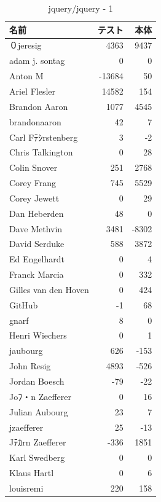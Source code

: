 \begin{table}[htb]
\begin{center}
\caption{jquery/jquery - 1}
\begin{tabular}{|l|r|r|} \hline 
名前 & テスト & 本体 \\ \hline \hline
０jeresig & 4363 & 9437\\ \hline
adam j. sontag & 0 & 0\\ \hline
Anton M & -13684 & 50\\ \hline
Ariel Flesler & 14582 & 154\\ \hline
Brandon Aaron & 1077 & 4545\\ \hline
brandonaaron & 42 & 7\\ \hline
Carl Fﾃｼrstenberg & 3 & -2\\ \hline
Chris Talkington & 0 & 28\\ \hline
Colin Snover & 251 & 2768\\ \hline
Corey Frang & 745 & 5529\\ \hline
Corey Jewett & 0 & 29\\ \hline
Dan Heberden & 48 & 0\\ \hline
Dave Methvin & 3481 & -8302\\ \hline
David Serduke & 588 & 3872\\ \hline
Ed Engelhardt & 0 & 4\\ \hline
Franck Marcia & 0 & 332\\ \hline
Gilles van den Hoven & 0 & 424\\ \hline
GitHub & -1 & 68\\ \hline
gnarf & 8 & 0\\ \hline
Henri Wiechers & 0 & 1\\ \hline
jaubourg & 626 & -153\\ \hline
John Resig & 4893 & -526\\ \hline
Jordan Boesch & -79 & -22\\ \hline
Joﾌ・n Zaefferer & 0 & 16\\ \hline
Julian Aubourg & 23 & 7\\ \hline
jzaefferer & 25 & -13\\ \hline
Jﾃｶrn Zaefferer & -336 & 1851\\ \hline
Karl Swedberg & 0 & 0\\ \hline
Klaus Hartl & 0 & 6\\ \hline
louisremi & 220 & 158\\ \hline
\end{tabular}
\end{center}
\end{table}

